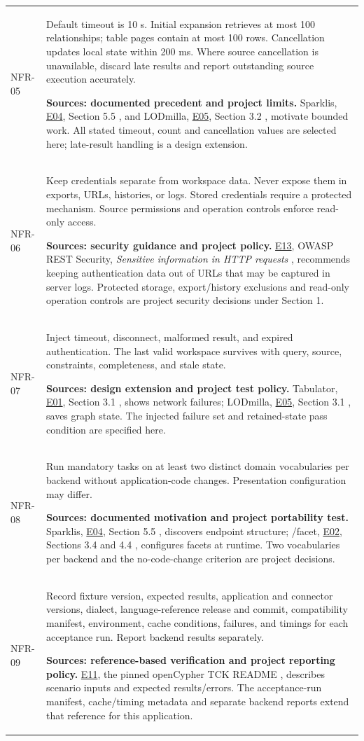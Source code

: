 \documentclass[11pt,a4paper]{article}
\newcommand{\evidence}[1]{\hyperlink{evidence:#1}{#1}}
\begin{document}
{\begin{longtable}{@{}P{1.35cm}P{14.35cm}@{}}
NFR-05 & Default timeout is 10 s. Initial expansion retrieves at most 100 relationships; table pages contain at most 100 rows. Cancellation updates local state within 200 ms. Where source cancellation is unavailable, discard late results and report outstanding source execution accurately.\par\smallskip \textbf{Sources: documented precedent and project limits.} Sparklis, \evidence{E04}, Section 5.5 \citep{sparklis}, and LODmilla, \evidence{E05}, Section 3.2 \citep{lodmilla}, motivate bounded work. All stated timeout, count and cancellation values are selected here; late-result handling is a design extension.\\
NFR-06 & Keep credentials separate from workspace data. Never expose them in exports, URLs, histories, or logs. Stored credentials require a protected mechanism. Source permissions and operation controls enforce read-only access.\par\smallskip \textbf{Sources: security guidance and project policy.} \evidence{E13}, OWASP REST Security, \emph{Sensitive information in HTTP requests} \citep{owasprest}, recommends keeping authentication data out of URLs that may be captured in server logs. Protected storage, export/history exclusions and read-only operation controls are project security decisions under Section 1.\\
NFR-07 & Inject timeout, disconnect, malformed result, and expired authentication. The last valid workspace survives with query, source, constraints, completeness, and stale state.\par\smallskip \textbf{Sources: design extension and project test policy.} Tabulator, \evidence{E01}, Section 3.1 \citep{tabulator}, shows network failures; LODmilla, \evidence{E05}, Section 3.1 \citep{lodmilla}, saves graph state. The injected failure set and retained-state pass condition are specified here.\\
NFR-08 & Run mandatory tasks on at least two distinct domain vocabularies per backend without application-code changes. Presentation configuration may differ.\par\smallskip \textbf{Sources: documented motivation and project portability test.} Sparklis, \evidence{E04}, Section 5.5 \citep{sparklis}, discovers endpoint structure; /facet, \evidence{E02}, Sections 3.4 and 4.4 \citep{facet}, configures facets at runtime. Two vocabularies per backend and the no-code-change criterion are project decisions.\\
NFR-09 & Record fixture version, expected results, application and connector versions, dialect, language-reference release and commit, compatibility manifest, environment, cache conditions, failures, and timings for each acceptance run. Report backend results separately.\par\smallskip \textbf{Sources: reference-based verification and project reporting policy.} \evidence{E11}, the pinned openCypher TCK README \citep{opencypher}, describes scenario inputs and expected results/errors. The acceptance-run manifest, cache/timing metadata and separate backend reports extend that reference for this application.\\

\end{longtable}}
\end{document}
